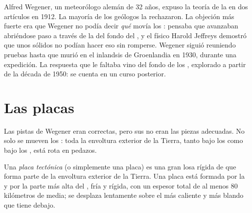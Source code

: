\begin{history}
Alfred Wegener, un meteorólogo alemán de 32 años, expuso la teoría de la
 en dos artículos en 1912. La mayoría de los geólogos la
rechazaron. La objeción más fuerte era que Wegener no podía decir \emph{qué}
movía los : pensaba que avanzaban abriéndose paso a través de la
 del fondo del , y el físico Harold Jeffreys demostró que unos
 sólidos no podían hacer eso sin romperse. Wegener siguió
reuniendo pruebas hasta que murió en el inlandsis de Groenlandia en
1930, durante una expedición. La respuesta que le faltaba vino del fondo de
los , explorado a partir de la década de 1950: se cuenta en un curso
posterior.
\end{history}

\section{Las placas}

Las pistas de Wegener eran correctas, pero sus  no eran las
piezas adecuadas. No solo se mueven los : toda la envoltura
exterior de la Tierra, tanto bajo los  como bajo los ,
está rota en pedazos.

\begin{definition}\label{def:g7:plate-tectonics:plate}
Una \emph{placa tectónica} (o
simplemente una placa) es una gran losa rígida de  que forma parte de
la envoltura exterior de la Tierra. Una placa está formada por la  y
por la parte más alta del , fría y rígida, con un espesor total de al
menos 80 kilómetros de media; se desplaza lentamente sobre el  más
caliente y más blando que tiene debajo.
\end{definition}

